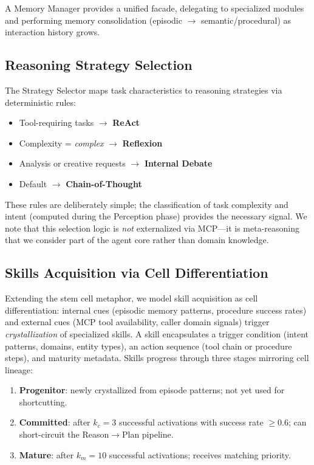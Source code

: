 \documentclass{article}
\begin{document}
A Memory Manager provides a unified facade, delegating to specialized modules and performing memory consolidation (episodic $\rightarrow$ semantic/procedural) as interaction history grows.

\subsection{Reasoning Strategy Selection}
\label{sec:strategy}

The Strategy Selector maps task characteristics to reasoning strategies via deterministic rules:

\begin{itemize}
\item Tool-requiring tasks $\rightarrow$ \textbf{ReAct}~\citep{wei2026agentic}
\item Complexity = \emph{complex} $\rightarrow$ \textbf{Reflexion}~\citep{wei2026agentic}
\item Analysis or creative requests $\rightarrow$ \textbf{Internal Debate}~\citep{tran2025multiagent}
\item Default $\rightarrow$ \textbf{Chain-of-Thought}~\citep{wei2026agentic}
\end{itemize}

These rules are deliberately simple; the classification of task complexity and intent (computed during the Perception phase) provides the necessary signal. We note that this selection logic is \emph{not} externalized via MCP---it is meta-reasoning that we consider part of the agent core rather than domain knowledge.

\subsection{Skills Acquisition via Cell Differentiation}
\label{sec:skills}

Extending the stem cell metaphor, we model skill acquisition as cell differentiation: internal cues (episodic memory patterns, procedure success rates) and external cues (MCP tool availability, caller domain signals) trigger \emph{crystallization} of specialized skills. A skill encapsulates a trigger condition (intent patterns, domains, entity types), an action sequence (tool chain or procedure steps), and maturity metadata. Skills progress through three stages mirroring cell lineage:

\begin{enumerate}
\item \textbf{Progenitor}: newly crystallized from episode patterns; not yet used for shortcutting.
\item \textbf{Committed}: after $k_c{=}3$ successful activations with success rate ${\geq}0.6$; can short-circuit the Reason${\to}$Plan pipeline.
\item \textbf{Mature}: after $k_m{=}10$ successful activations; receives matching priority.
\end{enumerate}
\end{document}
